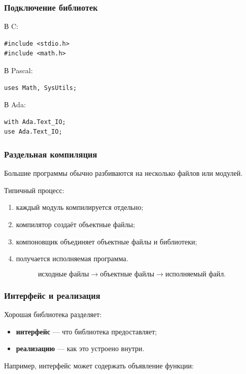 \documentclass[12pt,a4paper]{article}
\begin{document}
\subsubsection{Подключение библиотек}

В C:

\begin{verbatim}
#include <stdio.h>
#include <math.h>
\end{verbatim}

В Pascal:

\begin{verbatim}
uses Math, SysUtils;
\end{verbatim}

В Ada:

\begin{verbatim}
with Ada.Text_IO;
use Ada.Text_IO;
\end{verbatim}

\subsubsection{Раздельная компиляция}

Большие программы обычно разбиваются на несколько файлов или модулей.

Типичный процесс:
\begin{enumerate}
    \item каждый модуль компилируется отдельно;
    \item компилятор создаёт объектные файлы;
    \item компоновщик объединяет объектные файлы и библиотеки;
    \item получается исполняемая программа.
\end{enumerate}

\[
\text{исходные файлы}
\to
\text{объектные файлы}
\to
\text{исполняемый файл}.
\]

\subsubsection{Интерфейс и реализация}

Хорошая библиотека разделяет:
\begin{itemize}
    \item \textbf{интерфейс} --- что библиотека предоставляет;
    \item \textbf{реализацию} --- как это устроено внутри.
\end{itemize}

Например, интерфейс может содержать объявление функции:
\end{document}
